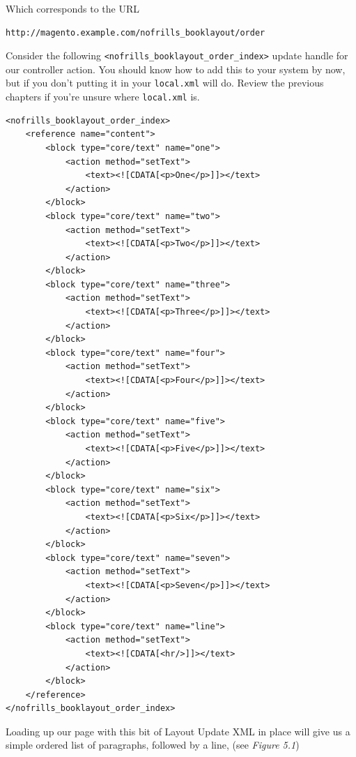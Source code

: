\documentclass[oneside]{book}
\begin{document}
Which corresponds to the URL

\begin{lstlisting}
http://magento.example.com/nofrills_booklayout/order

\end{lstlisting}


Consider the following \footnotesize\texttt{\textless nofrills\_booklayout\_order\_index\textgreater } \normalsize  update handle for our controller action.  You should know how to add this to your system by now, but if you don't putting it in your \footnotesize\texttt{local.xml} \normalsize  will do.  Review the previous chapters if you're unsure where \footnotesize\texttt{local.xml} \normalsize  is.

\begin{lstlisting}
<nofrills_booklayout_order_index>
    <reference name="content">
        <block type="core/text" name="one">
            <action method="setText">
                <text><![CDATA[<p>One</p>]]></text>
            </action>
        </block>
        <block type="core/text" name="two">
            <action method="setText">
                <text><![CDATA[<p>Two</p>]]></text>
            </action>
        </block>
        <block type="core/text" name="three">
            <action method="setText">
                <text><![CDATA[<p>Three</p>]]></text>
            </action>
        </block>
        <block type="core/text" name="four">
            <action method="setText">
                <text><![CDATA[<p>Four</p>]]></text>
            </action>
        </block>
        <block type="core/text" name="five">
            <action method="setText">
                <text><![CDATA[<p>Five</p>]]></text>
            </action>
        </block>
        <block type="core/text" name="six">
            <action method="setText">
                <text><![CDATA[<p>Six</p>]]></text>
            </action>
        </block>
        <block type="core/text" name="seven">
            <action method="setText">
                <text><![CDATA[<p>Seven</p>]]></text>
            </action>
        </block>
        <block type="core/text" name="line">
            <action method="setText">
                <text><![CDATA[<hr/>]]></text>
            </action>
        </block>
    </reference>
</nofrills_booklayout_order_index>

\end{lstlisting}


Loading up our page with this bit of Layout Update XML in place will give us a simple ordered list of paragraphs, followed by a line, (see \emph{Figure 5.1})
\end{document}
